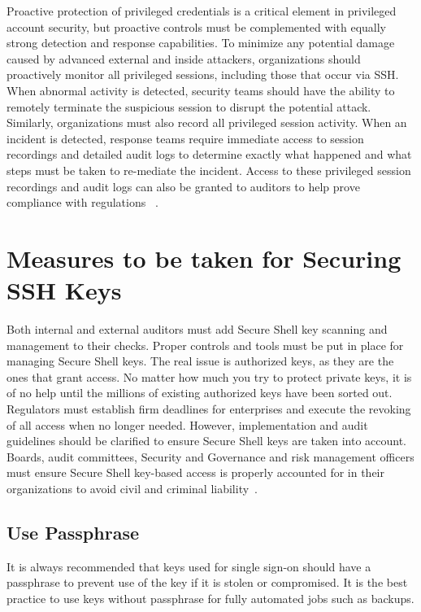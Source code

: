 Proactive protection of privileged credentials is a critical element
in privileged account security, but proactive controls must be 
complemented with equally strong detection and response capabilities.
To minimize any potential damage caused by advanced external and
inside attackers, organizations should proactively monitor all
privileged sessions, including those that occur via SSH. When abnormal
activity is detected, security teams should have the ability to
remotely terminate the suspicious session to disrupt the potential attack.
Similarly, organizations must also record all privileged session activity.
When an incident is detected, response teams require immediate access to
session recordings and detailed audit logs to determine exactly what
happened and what steps must be taken to re-mediate the incident.
Access to these privileged session recordings and audit logs can also be
granted to auditors to help prove compliance with regulations
~\cite{hid-sp18-513-gutmann}.

\section{Measures to be taken for Securing SSH Keys}

Both internal and external auditors must add Secure Shell key 
scanning and management to their checks. Proper controls and tools
must be put in place for managing Secure Shell keys. The real issue
is authorized keys, as they are the ones that grant access. No
matter how much you try to protect private keys, it is of no help 
until the millions of existing authorized keys have been sorted out.
Regulators must establish firm deadlines for enterprises and execute 
the revoking of all access when no longer needed. However, 
implementation and audit guidelines should be clarified
to ensure Secure Shell keys are taken into account. Boards, 
audit committees, Security and Governance and risk management 
officers must ensure Secure Shell key-based access is
properly accounted for in their organizations to avoid civil 
and criminal liability~\cite{hid-sp18-513-network}.

\subsection{Use Passphrase}

It is always recommended that keys used for single sign-on should 
have a passphrase to prevent use of the key if it is stolen or 
compromised. It is the best practice to use keys without
passphrase for fully automated jobs such as backups.

